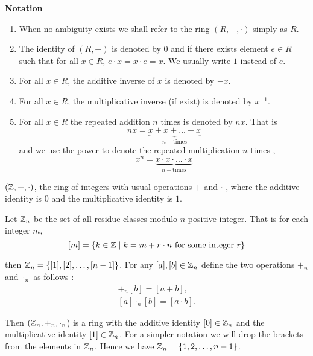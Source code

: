 \noindent
\textbf{Notation}
\begin{enumerate}
    \item When no ambiguity exists we shall refer to the ring \((R,+,\cdot)\) simply as \(R\).

    \item The identity of \((R,+)\) is denoted by \(0\) and if there exists element \(e \in R\) such that for all \(x \in R\), \(e\cdot x=x\cdot e=x\). We usually write \(1\) instead of \(e\).
    
    \item For all \(x \in R\), the additive inverse of \(x\) is denoted by \(-x\).

    \item For all \(x \in R\), the multiplicative inverse (if exist) is denoted by \(x^{-1}\).

    \item For all \(x \in R\) the repeated addition \(n\) times is denoted by \(n x\). That is
    \[
    n x =\underbrace{x+x+\dots +x}_{n-\text{times}}
    \]
    and we use the power to denote the repeated multiplication \(n\) times ,
    \[
    x^n=\underbrace{x\cdot x\cdot...\cdot x}_{n-\text{times}}
    \]
\end{enumerate}

\begin{example}
\label{ex7}
    \((\mathbb{Z},+,\cdot)\), the ring of integers with usual operations \(+\) and \(\cdot\) , where the additive identity is \(0\) and the multiplicative identity is \(1\).
\end{example}

\begin{example}
\label{ex8}
    Let \(\mathbb{Z}_n\) be the set of all residue classes modulo \(n\) positive integer. That is for each integer \(m\),
    \[
    [m]=\{k \in \mathbb{Z} \mid k=m+r\cdot n\text{ for some integer } r\}
    \]
    
    then \(\mathbb{Z}_n =\{[1],[2],\dots,[n-1]\}\). For any \([a],[b]\in\mathbb{Z}_n\) define the two operations \(+_n\) and \(\cdot_n\) as follows :
    \begin{gather*}
        [a]+_n[b]=[a+b],\\
        [a]\cdot_n[b]=[a\cdot b].
    \end{gather*}
    
    Then \((\mathbb{Z}_n,+_n,\cdot_n\)) is a ring with the additive identity \([0] \in \mathbb{Z}_n\) and the multiplicative identity \([1] \in \mathbb{Z}_n\). For a simpler notation we will drop the brackets from the elements in \(\mathbb{Z}_n\). Hence we have \(\mathbb{Z}_n=\{1,2,\dots,n-1\}\).
\end{example}

